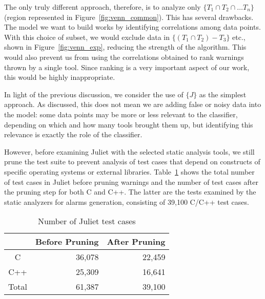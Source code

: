 

The only truly different approach, therefore, is to analyze only $\{T_1 \cap
T_2 \cap\dots T_n\}$ (region represented in Figure~\ref{fig:venn_common}). This
has several drawbacks. The model we want to build works by identifying
correlations among data points. With this choice of subset, we would exclude
data in $\{(T_1 \cap T_2) - T_3\}$ etc., shown in Figure~\ref{fig:venn_exp}, reducing the strength of the
algorithm. This would also prevent us from using the correlations obtained to
rank warnings thrown by a single tool.  Since ranking is a very important
aspect of our work, this would be highly inappropriate.





In light of the previous discussion, we consider the use
of $\{J\}$ as the simplest approach. As discussed, this does
not mean we are adding false or noisy data into the
model: some data points may be more or less relevant to the
classifier, depending on which and how many tools brought
them up, but identifying this relevance is exactly the
role of the classifier.

However, before examining Juliet with the selected static analysis tools, we still prune the
test suite to prevent analysis of test cases that depend on constructs of
specific operating systems or external libraries.
Table~\ref{tab:juliet_numbers} shows the total number of test cases in Juliet
before pruning warnings and the number of test cases after the pruning step for
both C and C++. The latter are the tests examined by the static analyzers for
alarms generation, consisting of 39,100 C/C++ test cases.

  \begin{table}
    \begin{center}
        \begin{tabular}{crr}\hline
          & Before Pruning & After Pruning \\
        \hline
          C & 36,078 & 22,459 \\
          C++ & 25,309 & 16,641 \\
          Total & 61,387 & 39,100 \\ \hline
        \end{tabular}
        \caption{Number of Juliet test cases}\label{tab:juliet_numbers}
    \end{center}
\end{table}

